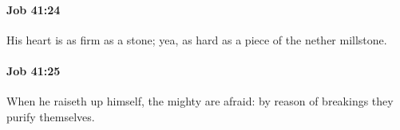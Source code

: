 		\paragraph{Job 41:24} %
			\label{JOB-41-24}

			His heart is as firm as a stone; yea, as hard as a piece of the nether millstone.


		\paragraph{Job 41:25} %
			\label{JOB-41-25}

			When he raiseth up himself, the mighty are afraid: by reason of breakings they purify themselves.


